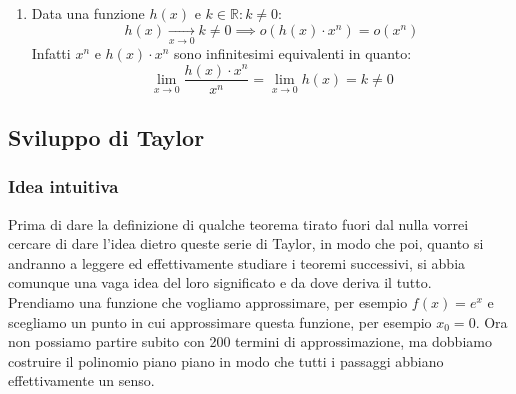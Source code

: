 \begin{enumerate}
	\item Data una funzione $h(x)$ e $k \in \mathbb{R} : k \neq 0$:
		\begin{equation*}
			h(x) \xrightarrow[x \to 0]{} k \neq 0 \implies o(h(x) \cdot x^n) = 
            o(x^n)
		\end{equation*}
		Infatti $x^n$ e $h(x) \cdot x^n$ sono infinitesimi equivalenti in 
        quanto:
		\begin{equation*}
			\lim_{x \to 0} \dfrac{h(x) \cdot x^n}{x^n} = \lim_{x \to 0} h(x) = 
            k \neq 0
		\end{equation*}
\end{enumerate}

\subsection{Sviluppo di Taylor}

\subsubsection{Idea intuitiva}
Prima di dare la definizione di qualche teorema tirato fuori dal nulla vorrei 
cercare di dare l'idea dietro queste serie di Taylor, in modo che poi, quanto 
si andranno a leggere ed effettivamente studiare i teoremi successivi, si abbia 
comunque una vaga idea del loro significato e da dove deriva il tutto.\\

Prendiamo una funzione che vogliamo approssimare, per esempio $f(x) = e^x$ e 
scegliamo un punto in cui approssimare questa funzione, per esempio $x_0 = 0$. 
Ora non possiamo partire subito con 200 termini di approssimazione, ma dobbiamo 
costruire il polinomio piano piano in modo che tutti i passaggi abbiano 
effettivamente un senso. 

